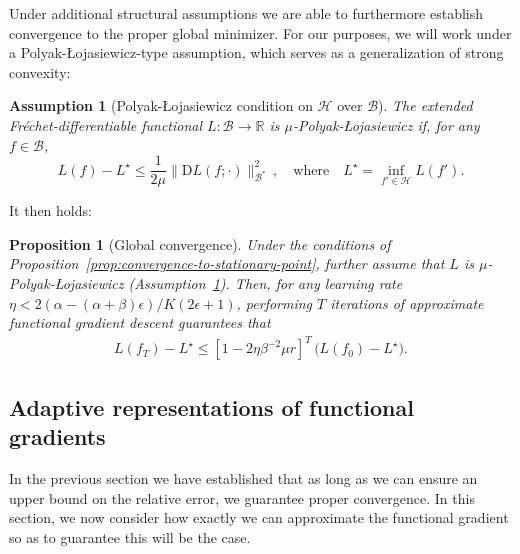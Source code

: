 \documentclass{article}
\newtheorem{proposition}[theorem]{Proposition}
\newtheorem{assumption}[theorem]{Assumption}
\newcommand{\R}{\mathbb{R}}
\renewcommand{\H}{\mathcal{H}}
\newcommand{\B}{\mathcal{B}}
\newcommand{\D}{\mathrm{D}}
\begin{document}
Under additional structural assumptions we are able to furthermore establish convergence to the proper global minimizer.
For our purposes, we will work under a Polyak-Łojasiewicz-type assumption, which serves as a generalization of strong convexity:

\begin{assumption}[Polyak-Łojasiewicz condition on $\H$ over $\B$]\label{assumpt:polyak-lojasiewicz}
    The extended Fréchet-differentiable functional $L : \B \to \R$ is $\mu$-Polyak-Łojasiewicz if, for any $f \in \B$,
    \[ L(f) - L^\star \leq \frac{1}{2\mu} \lVert \D L(f; \cdot) \rVert_{\B^*}^2\,,\quad
    \text{where}\quad  L^\star = \inf_{f' \in \H} L(f').\]
\end{assumption}

It then holds:

\begin{proposition}[Global convergence]\label{prop:convergence-to-global-minimizer}
    Under the conditions of Proposition~\ref{prop:convergence-to-stationary-point}, further assume that $L$ is $\mu$-Polyak-Łojasiewicz (Assumption~\ref{assumpt:polyak-lojasiewicz}).
    Then, for any learning rate $\eta < 2 (\alpha - (\alpha + \beta) \epsilon) / K (2\epsilon + 1)$, performing $T$ iterations of approximate functional gradient descent guarantees that
    \begin{align*}
        L(f_T) - L^\star
        \leq [1 - 2 \eta \beta^{-2} \mu r]^T \, \bigl( L(f_0) - L^\star \bigr).
    \end{align*}
\end{proposition}

\subsection{Adaptive representations of functional gradients}\label{sec:method-fitting}

In the previous section we have established that as long as we can ensure an upper bound on the relative error, we guarantee proper convergence.
In this section, we now consider how exactly we can approximate the functional gradient so as to guarantee this will be the case.
\end{document}
